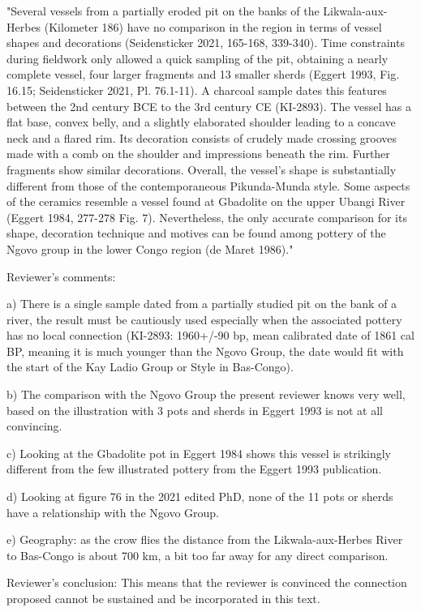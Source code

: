 \begin{reviewer}
"Several vessels from a partially eroded pit on the banks of the Likwala-aux-Herbes (Kilometer 186) have no comparison in the region in terms of vessel shapes and decorations (Seidensticker 2021, 165-168, 339-340). Time constraints during fieldwork only allowed a quick sampling of the pit, obtaining a nearly complete vessel, four larger fragments and 13 smaller sherds (Eggert 1993, Fig. 16.15; Seidensticker 2021, Pl. 76.1-11). A charcoal sample dates this features between the 2nd century BCE to the 3rd century CE (KI-2893). The vessel has a flat base, convex belly, and a slightly elaborated shoulder leading to a concave neck and a flared rim. Its decoration consists of crudely made crossing grooves made with a comb on the shoulder and impressions beneath the rim. Further fragments show similar decorations. Overall, the vessel's shape is substantially different from those of the contemporaneous Pikunda-Munda style. Some aspects of the ceramics resemble a vessel found at Gbadolite on the upper Ubangi River (Eggert 1984, 277-278 Fig. 7). Nevertheless, the only accurate comparison for its shape, decoration technique and motives can be found among pottery of the Ngovo group in the lower Congo region (de Maret 1986)."

Reviewer's comments:

a) There is a single sample dated from a partially studied pit on the bank of a river, the result must be cautiously used especially when the associated pottery has no local connection (KI-2893: 1960+/-90 bp, mean calibrated date of 1861 cal BP, meaning it is much younger than the Ngovo Group, the date would fit with the start of the Kay Ladio Group or Style in Bas-Congo).

b) The comparison with the Ngovo Group the present reviewer knows very well, based on the illustration with 3 pots and sherds in Eggert 1993 is not at all convincing.

c) Looking at the Gbadolite pot in Eggert 1984 shows this vessel is strikingly different from the few illustrated pottery from the Eggert 1993 publication.

d) Looking at figure 76 in the 2021 edited PhD, none of the 11 pots or sherds have a relationship with the Ngovo Group.

e) Geography: as the crow flies the distance from the Likwala-aux-Herbes River to Bas-Congo is about 700 km, a bit too far away for any direct comparison.

Reviewer's conclusion: This means that the reviewer is convinced the connection proposed cannot be sustained and be incorporated in this text.


\end{reviewer}

